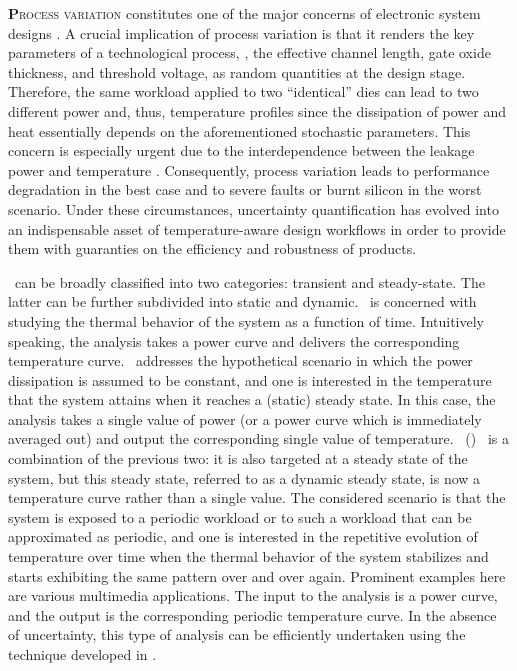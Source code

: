 \lettrine[findent=0.4em, nindent=0em]{\textbf{P}}{rocess variation} constitutes one of the major concerns of electronic system designs \cite{srivastava2010}.
A crucial implication of process variation is that it renders the key parameters of a technological process, \eg, the effective channel length, gate oxide thickness, and threshold voltage, as random quantities at the design stage.
Therefore, the same workload applied to two ``identical'' dies can lead to two different power and, thus, temperature profiles since the dissipation of power and heat essentially depends on the aforementioned stochastic parameters.
This concern is especially urgent due to the interdependence between the leakage power and temperature \cite{liu2007}.
Consequently, process variation leads to performance degradation in the best case and to severe faults or burnt silicon in the worst scenario.
Under these circumstances, uncertainty quantification \cite{maitre2010} has evolved into an indispensable asset of temperature-aware design workflows in order to provide them with guaranties on the efficiency and robustness of products.

\Ta\ can be broadly classified into two categories: transient and steady-state.
The latter can be further subdivided into static and dynamic.
\Tta\ is concerned with studying the thermal behavior of the system as a function of time.
Intuitively speaking, the analysis takes a power curve and delivers the corresponding temperature curve.
\Sssta\ addresses the hypothetical scenario in which the power dissipation is assumed to be constant, and one is interested in the temperature that the system attains when it reaches a (static) steady state.
In this case, the analysis takes a single value of power (or a power curve which is immediately averaged out) and output the corresponding single value of temperature.
\Dss\ (\DSS) \ta\ is a combination of the previous two: it is also targeted at a steady state of the system, but this steady state, referred to as a dynamic steady state, is now a temperature curve rather than a single value.
The considered scenario is that the system is exposed to a periodic workload or to such a workload that can be approximated as periodic, and one is interested in the repetitive evolution of temperature over time when the thermal behavior of the system stabilizes and starts exhibiting the same pattern over and over again.
Prominent examples here are various multimedia applications.
The input to the analysis is a power curve, and the output is the corresponding periodic temperature curve.
In the absence of uncertainty, this type of analysis can be efficiently undertaken using the technique developed in \cite{ukhov2012}.

